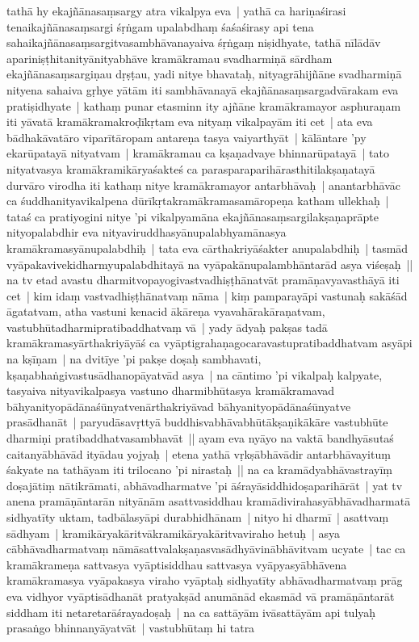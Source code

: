 \documentclass[article,12pt,a4paper]{memoir}%
\newcommand{\persName}[1]{#1}
\newcounter{parCount}
\begin{document}
	  \pstart \leavevmode%
	\label{thakur75-92.10}tathā hy ekajñānasaṃsargy atra vikalpya eva | yathā ca hariṇaśirasi tenaikajñānasaṃsargi śṛṅgam upalabdhaṃ śaśaśirasy api tena sahaikajñānasaṃsargitvasambhāvanayaiva śṛṅgaṃ niṣidhyate, tathā nīlādāv apariniṣṭhitanityānityabhāve kramākramau svadharmiṇā sārdham ekajñānasaṃsargiṇau dṛṣṭau, yadi nitye bhavataḥ, nityagrāhijñāne svadharmiṇā nityena sahaiva gṛhye yātām iti sambhāvanayā ekajñānasaṃsargadvārakam eva pratiṣidhyate | kathaṃ punar etasminn ity ajñāne kramākramayor asphuraṇam iti yāvatā kramākramakroḍīkṛtam eva nityaṃ vikalpayām iti cet | ata eva bādhakāvatāro viparītāropam antareṇa tasya vaiyarthyāt | \label{thakur75-92.17} kālāntare 'py ekarūpatayā nityatvam | kramākramau ca kṣaṇadvaye bhinnarūpatayā | tato nityatvasya kramākramikāryaśakteś ca parasparaparihārasthitilakṣaṇatayā durvāro virodha iti kathaṃ nitye kramākramayor antarbhāvaḥ | anantarbhāvāc ca śuddhanityavikalpena dūrīkṛtakramākramasamāropeṇa katham ullekhaḥ | tataś ca pratiyogini nitye 'pi vikalpyamāna ekajñānasaṃsargilakṣaṇaprāpte nityopalabdhir eva nityaviruddhasyānupalabhyamānasya kramākramasyānupalabdhiḥ | tata eva cārthakriyāśakter anupalabdhiḥ | tasmād vyāpakavivekidharmyupalabdhitayā na vyāpakānupalambhāntarād asya viśeṣaḥ || \label{thakur75-92.25} na tv etad avastu dharmitvopayogivastvadhiṣṭhānatvāt pramāṇavyavasthāyā iti cet | kim idaṃ vastvadhiṣṭhānatvaṃ nāma | kiṃ pamparayāpi vastunaḥ sakāśād āgatatvam, atha vastuni kenacid ākāreṇa vyavahārakāraṇatvam, vastubhūtadharmipratibaddhatvaṃ vā | \label{thakur75-93.1} yady ādyaḥ pakṣas tadā kramākramasyārthakriyāyāś ca vyāptigrahaṇagocaravastupratibaddhatvam asyāpi na kṣīṇam | \label{thakur75-93.2} na dvitīye 'pi pakṣe doṣaḥ sambhavati, kṣaṇabhaṅgivastusādhanopāyatvād asya | \label{thakur75-93.3} na cāntimo 'pi vikalpaḥ kalpyate, tasyaiva nityavikalpasya vastuno dharmibhūtasya kramākramavad bāhyanityopādānaśūnyatvenārthakriyāvad bāhyanityopādānaśūnyatve prasādhanāt | paryudāsavṛttyā buddhisvabhāvabhūtākṣaṇikākāre vastubhūte dharmiṇi pratibaddhatvasambhavāt || \label{thakur75-93.7} ayam eva nyāyo na vaktā bandhyāsutaś caitanyābhāvād ityādau yojyaḥ | etena yathā vṛkṣābhāvādir antarbhāvayituṃ śakyate na tathāyam iti \persName{trilocano} 'pi nirastaḥ || \label{thakur75-93.10} na ca kramādyabhāvastrayīṃ doṣajātiṃ nātikrāmati, abhāvadharmatve 'pi āśrayāsiddhidoṣaparihārāt | \label{thakur75-93.11} yat tv anena pramāṇāntarān nityānām asattvasiddhau kramādivirahasyābhāvadharmatā sidhyatīty uktam, tadbālasyāpi durabhidhānam | nityo hi dharmī | asattvaṃ sādhyam | kramikāryakāritvākramikāryakāritvaviraho hetuḥ | asya cābhāvadharmatvaṃ nāmāsattvalakṣaṇasvasādhyāvinābhāvitvam ucyate | tac ca kramākrameṇa sattvasya vyāptisiddhau sattvasya vyāpyasyābhāvena kramākramasya vyāpakasya viraho vyāptaḥ sidhyatīty abhāvadharmatvaṃ prāg eva vidhyor vyāptisādhanāt pratyakṣād anumānād ekasmād vā pramāṇāntarāt siddham iti netaretarāśrayadoṣaḥ | \label{thakur75-93.18} na ca sattāyām ivāsattāyām api tulyaḥ prasaṅgo bhinnanyāyatvāt | vastubhūtaṃ hi tatra 
\end{document}
